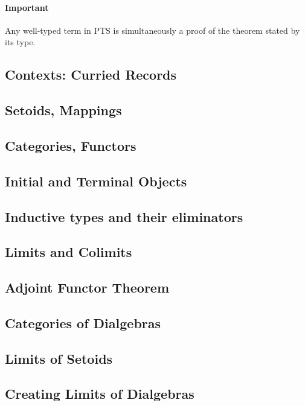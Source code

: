 \documentclass[11pt,oneside]{article}
\begin{document}
\paragraph{Important}
Any well-typed term in PTS is simultaneously a proof of the theorem stated by its type.

\subsection{Contexts: Curried Records}

\subsection{Setoids, Mappings}

\subsection{Categories, Functors}

\subsection{Initial and Terminal Objects}

\subsection{Inductive types and their eliminators}

\subsection{Limits and Colimits}

\subsection{Adjoint Functor Theorem}

\subsection{Categories of Dialgebras}

\subsection{Limits of Setoids}

\subsection{Creating Limits of Dialgebras}
\end{document}
